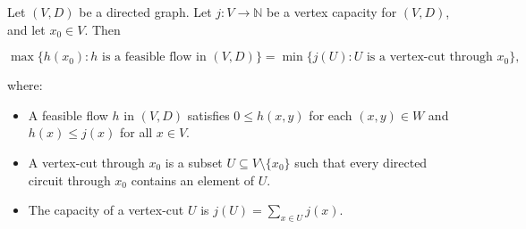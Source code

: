 Let $(V, D)$ be a directed graph. Let $j: V \to \mathbb{N}$ be a vertex capacity for $(V, D)$, and let $x_0 \in V$. Then

$$\max\{h(x_0): h \text{ is a feasible flow in } (V, D)\} = \min\{j(U): U \text{ is a vertex-cut through } x_0\},$$

where:
\begin{itemize}
\item A feasible flow $h$ in $(V, D)$ satisfies $0 \leq h(x, y)$ for each $(x, y) \in W$ and $h(x) \leq j(x)$ for all $x \in V$.
\item A vertex-cut through $x_0$ is a subset $U \subseteq V \setminus \{x_0\}$ such that every directed circuit through $x_0$ contains an element of $U$.
\item The capacity of a vertex-cut $U$ is $j(U) = \sum_{x \in U} j(x)$.
\end{itemize}
